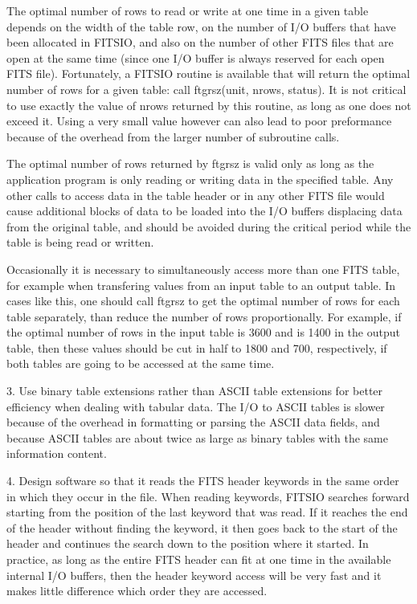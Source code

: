 \documentclass[11pt]{book}
\begin{document}
The optimal number of rows to read or write at one time in a given
table depends on the width of the table row, on the number of I/O
buffers that have been allocated in FITSIO, and also on the number of
other FITS files that are open at the same time (since one I/O buffer
is always reserved for each open FITS file).  Fortunately, a FITSIO
routine is available that will return the optimal number of rows for a
given table:  call ftgrsz(unit, nrows, status).  It is not critical to
use exactly the value of nrows returned by this routine, as long as one
does not exceed it.  Using a very small value however can also lead to
poor preformance because of the overhead from the larger number of
subroutine calls.

The optimal number of rows returned by ftgrsz is valid only as long as
the application program is only reading or writing data in the
specified table.  Any other calls to access data in the table header or
in any other FITS file would  cause additional blocks of data to be
loaded into the I/O buffers displacing data from the original table,
and should be avoided during the critical period while the table is
being read or written.

Occasionally it is necessary to simultaneously access more than one
FITS table, for example when transfering values from an input table to
an output table.  In cases like this, one should call ftgrsz to get the
optimal number of rows for each table separately, than reduce the
number of rows proportionally.  For example, if the optimal number of
rows in the input table is 3600 and is 1400 in the output table, then
these values should be cut in half to 1800 and 700, respectively, if
both tables are going to be accessed at the same time.

3.  Use binary table extensions rather than ASCII table
extensions for better efficiency  when dealing with tabular data.  The
I/O to ASCII tables is slower because of the overhead in formatting or
parsing the ASCII data fields, and because ASCII tables are about twice
as large as binary tables with the same information content.

4. Design software so that it reads the FITS header keywords in the
same order in which they occur in the file.  When reading keywords,
FITSIO searches forward starting from the position of the last keyword
that was read.  If it reaches the end of the header without finding the
keyword, it then goes back to the start of the header and continues the
search down to the position where it started.  In practice, as long as
the entire FITS header can fit at one time in the available internal I/O
buffers, then the header keyword access will be very fast and it makes
little difference which order they are accessed.
\end{document}
